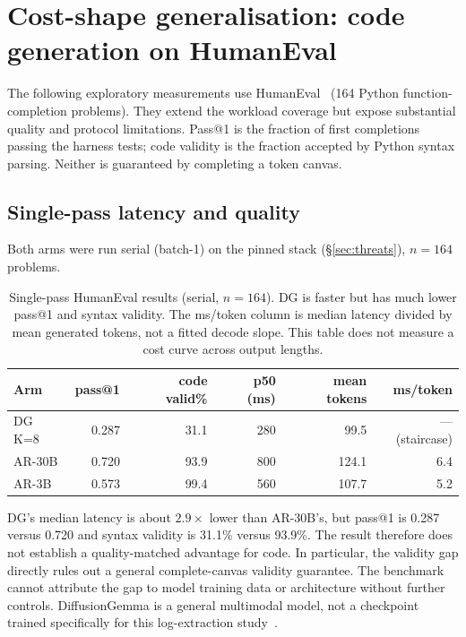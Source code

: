 \section{Cost-shape generalisation: code generation on HumanEval}
\label{app:humaneval}

The following exploratory measurements use HumanEval~\cite{humaneval}
(164 Python function-completion problems). They extend the workload
coverage but expose substantial quality and protocol limitations. Pass@1
is the fraction of first completions passing the harness tests; code
validity is the fraction accepted by Python syntax parsing. Neither is
guaranteed by completing a token canvas.

\subsection{Single-pass latency and quality}

Both arms were run serial (batch-1) on the pinned stack
(\S\ref{sec:threats}), $n{=}164$ problems.

\begin{table}[h]
\centering
\caption{Single-pass HumanEval results (serial, $n{=}164$). DG is
faster but has much lower pass@1 and syntax validity. The ms/token column
is median latency divided by mean generated tokens, not a fitted decode
slope. This table does not measure a cost curve across output lengths.}
\label{tab:humaneval}
\begin{tabular}{@{}lrrrrr@{}}
\toprule
Arm & pass@1 & code valid\% & p50 (ms) & mean tokens & ms/token \\
\midrule
DG K=8  & 0.287 & 31.1 & 280 & 99.5  & --- (staircase) \\
AR-30B  & 0.720 & 93.9 & 800 & 124.1 & 6.4 \\
AR-3B   & 0.573 & 99.4 & 560 & 107.7 & 5.2 \\
\bottomrule
\end{tabular}
\end{table}

DG's median latency is about $2.9\times$ lower than AR-30B's, but
pass@1 is 0.287 versus 0.720 and syntax validity is 31.1\% versus
93.9\%. The result therefore does not establish a quality-matched
advantage for code. In particular, the validity gap directly rules out
a general complete-canvas validity guarantee. The benchmark cannot
attribute the gap to model training data or architecture without further
controls. DiffusionGemma is a general multimodal model, not a checkpoint
trained specifically for this log-extraction study~\cite{diffusiongemma}.

